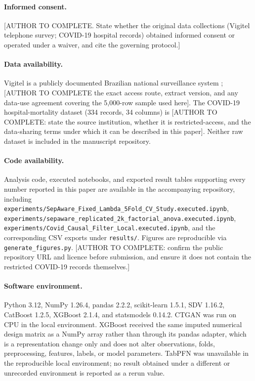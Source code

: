 \paragraph{Informed consent.}
[AUTHOR TO COMPLETE. State whether the original data collections (Vigitel telephone survey; COVID-19 hospital records) obtained informed consent or operated under a waiver, and cite the governing protocol.]

\paragraph{Data availability.}
Vigitel is a publicly documented Brazilian national surveillance system \citep{bernal2017}; [AUTHOR TO COMPLETE the exact access route, extract version, and any data-use agreement covering the 5,000-row sample used here]. The COVID-19 hospital-mortality dataset (334 records, 34 columns) is [AUTHOR TO COMPLETE: state the source institution, whether it is restricted-access, and the data-sharing terms under which it can be described in this paper]. Neither raw dataset is included in the manuscript repository.

\paragraph{Code availability.}
Analysis code, executed notebooks, and exported result tables supporting every number reported in this paper are available in the accompanying repository, including \texttt{experiments/SepAware\_Fixed\_Lambda\_5Fold\_CV\_Study.executed.ipynb}, \texttt{experiments/sepaware\_replicated\_2k\_factorial\_anova.executed.ipynb}, \texttt{experiments/Covid\_Causal\_Filter\_Local.executed.ipynb}, and the corresponding CSV exports under \texttt{results/}. Figures are reproducible via \texttt{generate\_figures.py}. [AUTHOR TO COMPLETE: confirm the public repository URL and licence before submission, and ensure it does not contain the restricted COVID-19 records themselves.]

\paragraph{Software environment.}
Python 3.12, NumPy 1.26.4, pandas 2.2.2, scikit-learn 1.5.1, SDV 1.16.2, CatBoost 1.2.5, XGBoost 2.1.4, and statsmodels 0.14.2. CTGAN was run on CPU in the local environment. XGBoost received the same imputed numerical design matrix as a NumPy array rather than through its pandas adapter, which is a representation change only and does not alter observations, folds, preprocessing, features, labels, or model parameters. TabPFN was unavailable in the reproducible local environment; no result obtained under a different or unrecorded environment is reported as a rerun value.
